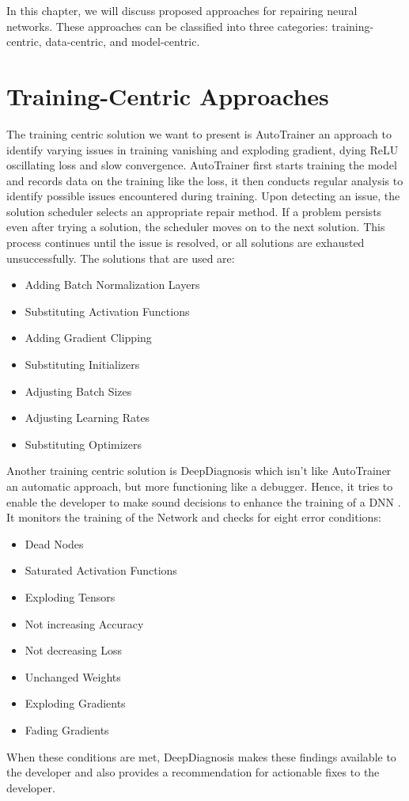 In this chapter, we will discuss proposed approaches for repairing neural networks.
These approaches \cite{nakagawa_experience_2023} can be classified into three categories: training-centric, data-centric, and model-centric.

\section{Training-Centric Approaches}\label{sec:training-centric-approaches}
The training centric solution we want to present is AutoTrainer \cite{zhang_autotrainer_2021} an approach to identify varying issues in training vanishing and exploding gradient, dying ReLU oscillating loss and slow convergence.
AutoTrainer first starts training the model and records data on the training like the loss, it then conducts regular analysis to identify possible issues encountered during training.
Upon detecting an issue, the solution scheduler selects an appropriate repair method.
If a problem persists even after trying a solution, the scheduler moves on to the next solution.
This process continues until the issue is resolved, or all solutions are exhausted unsuccessfully.
The solutions that are used are:
\begin{itemize}
    \item Adding Batch Normalization Layers
    \item Substituting Activation Functions
    \item Adding Gradient Clipping
    \item Substituting Initializers
    \item Adjusting Batch Sizes
    \item Adjusting Learning Rates
    \item Substituting Optimizers
\end{itemize}
Another training centric solution is DeepDiagnosis \cite{wardat_deepdiagnosis_2021} which isn't like AutoTrainer an automatic approach, but more functioning like a debugger.
Hence, it tries to enable the developer to make sound decisions to enhance the training of a DNN .
It monitors the training of the Network and checks for eight error conditions:
\begin{itemize}
    \item Dead Nodes
    \item Saturated Activation Functions
    \item Exploding Tensors
    \item Not increasing Accuracy
    \item Not decreasing Loss
    \item Unchanged Weights
    \item Exploding Gradients
    \item Fading Gradients
\end{itemize}
When these conditions are met, DeepDiagnosis makes these findings available to the developer and also provides a recommendation for actionable fixes to the developer.
